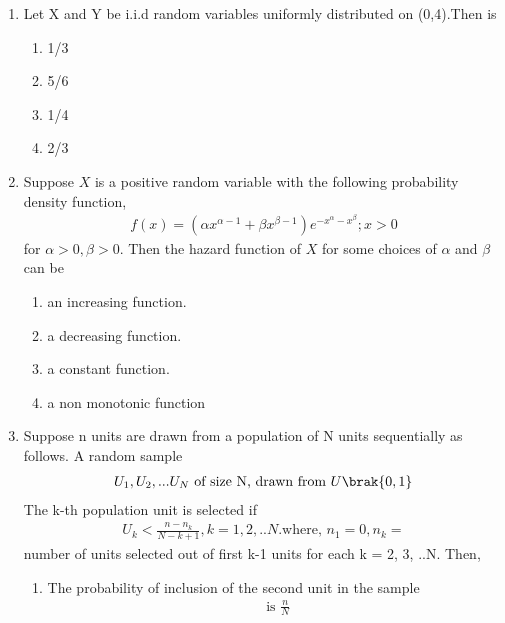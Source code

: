 \renewcommand{\theequation}{\theenumi}
\renewcommand{\thefigure}{\theenumi}
\begin{enumerate}[label=\thesection.\arabic*.,ref=\thesection.\theenumi]

\item Let X and Y be i.i.d random variables uniformly distributed on (0,4).Then  is
\begin{enumerate}
    \item 1/3
    \item 5/6
    \item 1/4
    \item 2/3
\end{enumerate}
\solution

%
\item Suppose $X$ is a positive random variable with the following probability density function,
\begin{align*}
f(x) = (\alpha x^{\alpha -1} + \beta x^{\beta-1} ) e^{-x^{\alpha}-x^{\beta}} ; x>0
\end{align*}
for $ \alpha >0, \beta >0$.
Then the hazard function of $X$ for some choices of $\alpha$ and $\beta$ can be
\begin{enumerate}
    \item an increasing function.
    \item a decreasing function.
    \item a constant function.
    \item a non monotonic function
\end{enumerate}
%
\solution

%
\item Suppose n units are drawn from a population of N units sequentially as follows. A random sample
\begin{align}
    U_1, U_2, ... U_N \text{ of size N, drawn from }U\brak{0, 1} 
\end{align} 
The k-th population unit is selected if 
\begin{align}
    U_k<\frac{n - n_k}{N-k+1}, k = 1, 2, ..N. \text{where, } n_1=0, n_k = 
\end{align}
number of units selected out of first k-1 units for each k = 2, 3, ..N. Then,
\begin{enumerate}
    \item The probability of inclusion of the second unit in the sample
    \begin{align}
        \text{ is } \frac{n}{N}

\end{align}
\end{enumerate}
\end{enumerate}
